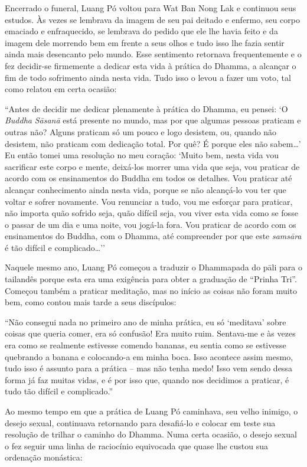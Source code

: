 Encerrado o funeral, Luang Pó voltou para Wat Ban Nong Lak e continuou
seus estudos. Às vezes se lembrava da imagem de seu pai deitado e
enfermo, seu corpo emaciado e enfraquecido, se lembrava do pedido que
ele lhe havia feito e da imagem dele morrendo bem em frente a seus olhos
e tudo isso lhe fazia sentir ainda mais desencanto pelo mundo. Esse
sentimento retornava frequentemente e o fez decidir-se firmemente a
dedicar esta vida à prática do Dhamma, a alcançar o fim de todo
sofrimento ainda nesta vida. Tudo isso o levou a fazer um voto, tal como
relatou em certa ocasião:

``Antes de decidir me dedicar plenamente à prática do Dhamma, eu pensei:
`O \emph{Buddha} \emph{Sāsanā} está presente no mundo, mas por que
algumas pessoas praticam e outras não? Alguns praticam só um pouco e
logo desistem, ou, quando não desistem, não praticam com dedicação
total. Por quê? É porque eles não sabem\ldots{}' Eu então tomei uma
resolução no meu coração: `Muito bem, nesta vida vou sacrificar este
corpo e mente, deixá-los morrer uma vida que seja, vou praticar de
acordo com os ensinamentos do Buddha em todos os detalhes. Vou praticar
até alcançar conhecimento ainda nesta vida, porque se não alcançá-lo vou
ter que voltar e sofrer novamente. Vou renunciar a tudo, vou me esforçar
para praticar, não importa quão sofrido seja, quão difícil seja, vou
viver esta vida como se fosse o passar de um dia e uma noite, vou
jogá-la fora. Vou praticar de acordo com os ensinamentos do Buddha, com
o Dhamma, até compreender por que este \emph{samsāra} é tão difícil e
complicado\ldots{}''

Naquele mesmo ano, Luang Pó começou a traduzir o Dhammapada do pāli para
o tailandês porque esta era uma exigência para obter a graduação de
``Prinha Tri''. Começou também a praticar meditação, mas no início as
coisas não foram muito bem, como contou mais tarde a seus discípulos:

``Não consegui nada no primeiro ano de minha prática, eu só `meditava'
sobre coisas que queria comer, era só confusão! Era muito ruim.
Sentava-me e às vezes era como se realmente estivesse comendo bananas,
eu sentia como se estivesse quebrando a banana e colocando-a em minha
boca. Isso acontece assim mesmo, tudo isso é assunto para a prática --
mas não tenha medo! Isso vem sendo dessa forma já faz muitas vidas, e é
por isso que, quando nos decidimos a praticar, é tudo tão difícil e
complicado.''

Ao mesmo tempo em que a prática de Luang Pó caminhava, seu velho
inimigo, o desejo sexual, continuava retornando para desafiá-lo e
colocar em teste sua resolução de trilhar o caminho do Dhamma. Numa
certa ocasião, o desejo sexual o fez seguir uma linha de raciocínio
equivocada que quase lhe custou sua ordenação monástica:

